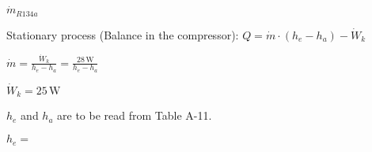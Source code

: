 \( \dot{m}_{R134a} \)  

Stationary process (Balance in the compressor):  
\( Q = \dot{m} \cdot (h_e - h_a) - \dot{W}_k \)  

\( \dot{m} = \frac{\dot{W}_k}{h_e - h_a} = \frac{28 \, \text{W}}{h_e - h_a} \)  

\( \dot{W}_k = 25 \, \text{W} \)  

\( h_e \) and \( h_a \) are to be read from Table A-11.  

\( h_e = \)